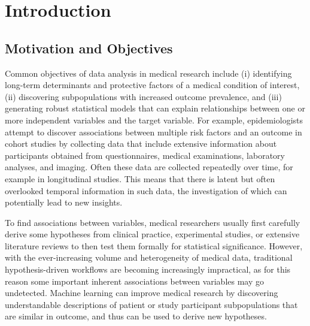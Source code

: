\documentclass[
  oneside]{book}
\begin{document}

\hypertarget{intro}{%
\chapter{Introduction}\label{intro}}

\hypertarget{motivation-and-objectives}{%
\section{Motivation and Objectives}\label{motivation-and-objectives}}

Common objectives of data analysis in medical research include (i) identifying long-term determinants and protective factors of a medical condition of interest, (ii) discovering subpopulations with increased outcome prevalence, and (iii) generating robust statistical models that can explain relationships between one or more independent variables and the target variable.
For example, epidemiologists attempt to discover associations between multiple risk factors and an outcome in cohort studies by collecting data that include extensive information about participants obtained from questionnaires, medical examinations, laboratory analyses, and imaging.
Often these data are collected repeatedly over time, for example in longitudinal studies.
This means that there is latent but often overlooked temporal information in such data, the investigation of which can potentially lead to new insights.

To find associations between variables, medical researchers usually first carefully derive some hypotheses from clinical practice, experimental studies, or extensive literature reviews to then test them formally for statistical significance.
However, with the ever-increasing volume and heterogeneity of medical data, traditional hypothesis-driven workflows are becoming increasingly impractical, as for this reason some important inherent associations between variables may go undetected.
Machine learning can improve medical research by discovering understandable descriptions of patient or study participant subpopulations that are similar in outcome, and thus can be used to derive new hypotheses.
\end{document}
